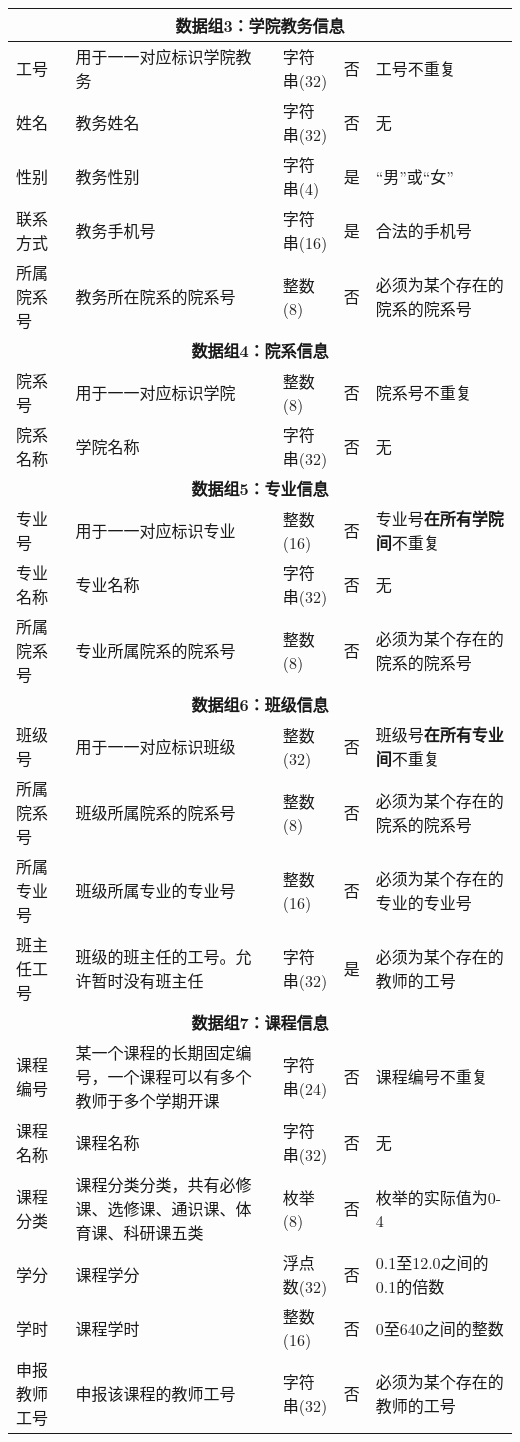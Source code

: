 \begin{center}
\begin{longtable}{p{6em}p{16em}p{8em}@{}p{2em}p{16em}}
        \multicolumn{5}{c}{\textbf{数据组3：学院教务信息}} \\
        \midrule
        工号 & 用于一一对应标识学院教务 & 字符串(32) & 否 & 工号不重复 \\   
        姓名 & 教务姓名 & 字符串(32) & 否 & 无 \\
        性别 & 教务性别 & 字符串(4) & 是 & “男”或“女” \\
        联系方式 & 教务手机号 & 字符串(16) & 是 & 合法的手机号 \\
        所属院系号 & 教务所在院系的院系号 & 整数(8) & 否 & 必须为某个存在的院系的院系号 \\
        \midrule

        \multicolumn{5}{c}{\textbf{数据组4：院系信息}} \\
        \midrule
        院系号 & 用于一一对应标识学院 & 整数(8) & 否 & 院系号不重复 \\
        院系名称 & 学院名称 & 字符串(32) & 否 & 无 \\
        \midrule

        \multicolumn{5}{c}{\textbf{数据组5：专业信息}} \\
        \midrule
        专业号 & 用于一一对应标识专业 & 整数(16) & 否 & 专业号\textbf{在所有学院间}不重复 \\
        专业名称 & 专业名称 & 字符串(32) & 否 & 无 \\
        所属院系号 & 专业所属院系的院系号 & 整数(8) & 否 & 必须为某个存在的院系的院系号 \\
        \midrule

        \multicolumn{5}{c}{\textbf{数据组6：班级信息}} \\
        \midrule
        班级号 & 用于一一对应标识班级 & 整数(32) & 否 & 班级号\textbf{在所有专业间}不重复 \\
        所属院系号 & 班级所属院系的院系号 & 整数(8) & 否 & 必须为某个存在的院系的院系号 \\
        所属专业号 & 班级所属专业的专业号 & 整数(16) & 否 & 必须为某个存在的专业的专业号 \\
        班主任工号 & 班级的班主任的工号。允许暂时没有班主任 & 字符串(32) & 是 & 必须为某个存在的教师的工号 \\
        \midrule

        \multicolumn{5}{c}{\textbf{数据组7：课程信息}} \\
        \midrule
        课程编号 & 某一个课程的长期固定编号，一个课程可以有多个教师于多个学期开课 & 字符串(24) & 否 & 课程编号不重复 \\
        课程名称 & 课程名称 & 字符串(32) & 否 & 无 \\
        课程分类 & 课程分类分类，共有必修课、选修课、通识课、体育课、科研课五类 & 枚举(8) & 否 & 枚举的实际值为0-4 \\
        学分 & 课程学分 & 浮点数(32) & 否 & 0.1至12.0之间的0.1的倍数 \\
        学时 & 课程学时 & 整数(16) & 否 & 0至640之间的整数 \\
        申报教师工号 & 申报该课程的教师工号 & 字符串(32) & 否 & 必须为某个存在的教师的工号 \\   
        \midrule


\end{longtable}
\end{center}
